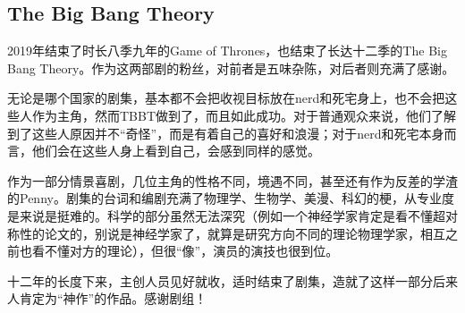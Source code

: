 \subsection{The Big Bang Theory}
2019年结束了时长八季九年的Game of Thrones，也结束了长达十二季的The Big Bang Theory。作为这两部剧的粉丝，对前者是五味杂陈，对后者则充满了感谢。

无论是哪个国家的剧集，基本都不会把收视目标放在nerd和死宅身上，也不会把这些人作为主角，然而TBBT做到了，而且如此成功。对于普通观众来说，他们了解到了这些人原因并不“奇怪”，而是有着自己的喜好和浪漫；对于nerd和死宅本身而言，他们会在这些人身上看到自己，会感到同样的感觉。

作为一部分情景喜剧，几位主角的性格不同，境遇不同，甚至还有作为反差的学渣的Penny。剧集的台词和编剧充满了物理学、生物学、美漫、科幻的梗，从专业度是来说是挺难的。科学的部分虽然无法深究（例如一个神经学家肯定是看不懂超对称性的论文的，别说是神经学家了，就算是研究方向不同的理论物理学家，相互之前也看不懂对方的理论），但很“像”，演员的演技也很到位。

十二年的长度下来，主创人员见好就收，适时结束了剧集，造就了这样一部分后来人肯定为“神作”的作品。感谢剧组！